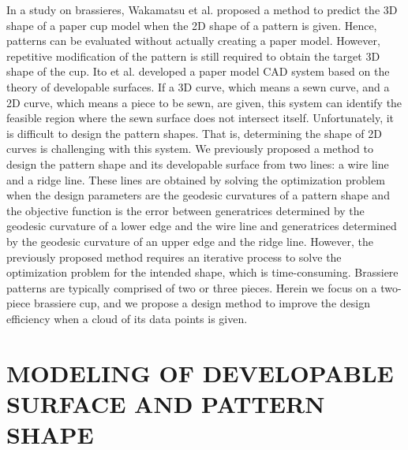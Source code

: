 \documentclass[E]{scitrans}
\begin{document}
In a study on brassieres, Wakamatsu et al. proposed a method to predict the 3D shape of a paper cup model when the 2D shape of a pattern is given\cite{c10,c11}. Hence, patterns can be evaluated without actually creating a paper model. However, repetitive modification of the pattern is still required to obtain the target 3D shape of the cup. Ito et al. developed a paper model CAD system based on the theory of developable surfaces\cite{c12}. If a 3D curve, which means a sewn curve, and a 2D curve, which means a piece to be sewn, are given, this system can identify the feasible region where the sewn surface does not intersect itself. Unfortunately, it is difficult to design the pattern shapes. That is, determining the shape of 2D curves is challenging with this system. 
We previously proposed a method to design the pattern shape and its developable surface from two lines: a wire line and a ridge line. These lines are obtained by solving the optimization problem when the design parameters are the geodesic curvatures of a pattern shape and the objective function is the error between generatrices determined by the geodesic curvature of a lower edge and the wire line and generatrices determined by the geodesic curvature of an upper edge and the ridge line. However, the previously proposed method requires an iterative process to solve the optimization problem for the intended shape\cite{c13}, which is time-consuming.
Brassiere patterns are typically comprised of two or three pieces. Herein we focus on a two-piece brassiere cup, and we propose a design method to improve the design efficiency when a cloud of its data points is given. 

\section*{MODELING OF DEVELOPABLE SURFACE AND PATTERN SHAPE}
\end{document}
